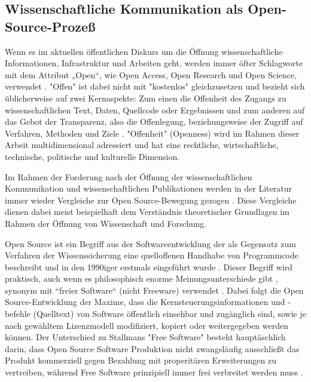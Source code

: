 \subsection{Wissenschaftliche Kommunikation als Open-Source-Prozeß}

Wenn es im aktuellen öffentlichen Diskurs um die Öffnung wissenschaftliche Informationen, Infrastruktur und Arbeiten geht, werden immer öfter Schlagworte mit dem Attribut „Open“, wie Open Access, Open Research und Open Science, verwendet \cite{bunz_2014} \cite{schulze_2013_open}. "Offen" ist dabei nicht mit "kostenlos" gleichzusetzen \cite{grand_2012_open} und bezieht sich üblicherweise auf zwei Kernaspekte: Zum einen die Offenheit des Zugangs zu wissenschaftlichen Text, Daten, Quellcode oder Ergebnissen und zum anderen auf das Gebot der Transparenz, also die Offenlegung, beziehungsweise der Zugriff auf Verfahren, Methoden und Ziele \cite{schulze_2013_open}. "Offenheit" (Openness) wird im Rahmen dieser Arbeit multidimensional adressiert und hat eine rechtliche, wirtschaftliche, technische, politische und kulturelle Dimension.

Im Rahmen der Forderung nach der Öffnung der wissenschaftlichen Kommunikation und wissenschaftlichen Publikationen werden in der Literatur immer wieder Vergleiche zur Open Source-Bewegung gezogen  \cite{cite:9} \cite{Peters_2014} \cite{RIN_2010_open_research} \cite[:423]{mantz_2007_open} \cite{cite:1}. Diese Vergleiche dienen dabei meist beispielhaft dem Verständnis theoretischer Grundlagen im Rahmen der Öffnung von Wissenschaft und Forschung.

Open Source ist ein Begriff aus der Softwareentwicklung der als Gegensatz zum Verfahren der Wissenssicherung \cite{stallman2002} eine quelloffenen Handhabe von Programmcode beschreibt und in den 1990iger erstmals eingeführt wurde \cite[:5]{hippel_2003_open}. Dieser Begriff wird praktisch, auch wenn es philosophisch enorme Meinungsunterschiede gibt \cite[:5]{hippel_2003_open}  \cite[:169]{stallman2002}, synonym mit “freier Software“ (nicht Freeware) verwendet \cite{naeder_2010_open} \cite[:414]{mantz_2007_open}. Dabei folgt die Open Source-Entwicklung der Maxime, dass die Kernsteuerungsinformationen und -befehle (Quelltext) von Software öffentlich einsehbar und zugänglich sind, sowie je nach gewähltem Lizenzmodell modifiziert, kopiert oder weitergegeben werden können. Der Unterschied zu Stallmans "Free Software" besteht hauptäschlich darin, dass Open Source Software Produktion nicht zwangsläufig ausschließt das Produkt kommerziell gegen Bezahlung mit properitären Erweiterungen zu vertreiben, während Free Software prinzipiell immer frei verbreitet werden muss \cite{stallman2002}.

